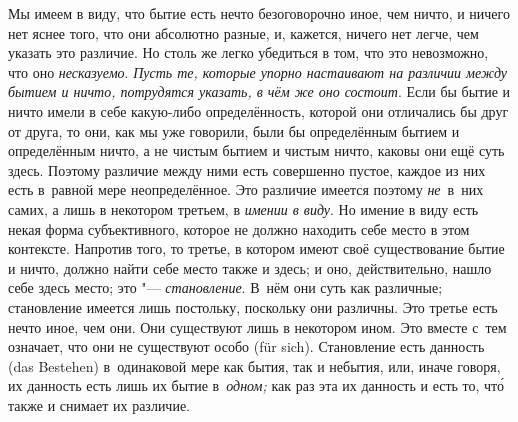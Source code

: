 Мы имеем в виду, что бытие есть нечто безоговорочно иное, чем ничто, и ничего
нет яснее того, что они абсолютно разные, и, кажется, ничего нет легче, чем
указать это различие. Но столь же легко убедиться в том, что это невозможно,
что оно {\em несказуемо}. {\em Пусть те, которые упорно настаивают на
различии между бытием и ничто, потрудятся указать, в чём же оно состоит}. Если
бы бытие и ничто имели в себе какую-либо определённость, которой они отличались
бы друг от друга, то они, как мы уже говорили, были бы определённым бытием и
определённым ничто, а не чистым бытием и чистым ничто, каковы они ещё суть
здесь. Поэтому различие между ними есть совершенно пустое, каждое из них есть
в~равной мере неопределённое. Это различие имеется поэтому {\em не}~в~них
самих, а лишь в некотором третьем, в {\em имении в виду}. Но имение в виду есть
некая форма субъективного, которое не должно находить себе место в этом
контексте. Напротив того, то третье, в котором имеют своё существование бытие и
ничто, должно найти себе место также и здесь; и оно, действительно, нашло себе
здесь место; это "--- {\em становление}. В~нём они суть как различные;
становление имеется лишь постольку, поскольку они различны. Это третье есть
нечто иное, чем они. Они существуют лишь в некотором ином. Это вместе с~тем
означает, что они не существуют особо (für sich). Становление есть данность
(das Bestehen) в~одинаковой мере как бытия, так и небытия, или, иначе говоря,
их данность есть лишь их бытие в~{\em одном;} как раз эта их данность и есть
то, чт\'{о} также и снимает их различие.

